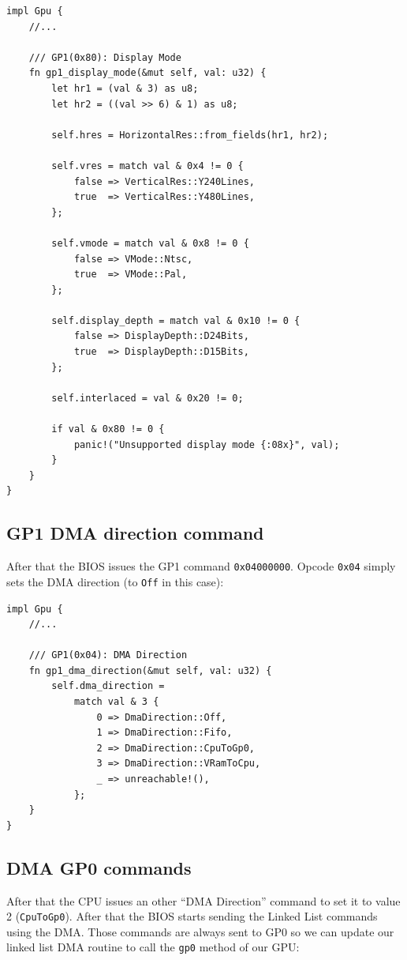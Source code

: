 \documentclass[a4paper]{article}
\newcommand{\code}[1] {\texttt{#1}}
\begin{document}
\begin{lstlisting}
impl Gpu {
    //...

    /// GP1(0x80): Display Mode
    fn gp1_display_mode(&mut self, val: u32) {
        let hr1 = (val & 3) as u8;
        let hr2 = ((val >> 6) & 1) as u8;

        self.hres = HorizontalRes::from_fields(hr1, hr2);

        self.vres = match val & 0x4 != 0 {
            false => VerticalRes::Y240Lines,
            true  => VerticalRes::Y480Lines,
        };

        self.vmode = match val & 0x8 != 0 {
            false => VMode::Ntsc,
            true  => VMode::Pal,
        };

        self.display_depth = match val & 0x10 != 0 {
            false => DisplayDepth::D24Bits,
            true  => DisplayDepth::D15Bits,
        };

        self.interlaced = val & 0x20 != 0;

        if val & 0x80 != 0 {
            panic!("Unsupported display mode {:08x}", val);
        }
    }
}
\end{lstlisting}

\subsection{GP1 DMA direction command}

After that the BIOS issues the GP1 command \code{0x04000000}. Opcode
\code{0x04} simply sets the DMA direction (to \code{Off} in this
case):

\begin{lstlisting}
impl Gpu {
    //...

    /// GP1(0x04): DMA Direction
    fn gp1_dma_direction(&mut self, val: u32) {
        self.dma_direction =
            match val & 3 {
                0 => DmaDirection::Off,
                1 => DmaDirection::Fifo,
                2 => DmaDirection::CpuToGp0,
                3 => DmaDirection::VRamToCpu,
                _ => unreachable!(),
            };
    }
}
\end{lstlisting}

\subsection{DMA GP0 commands}

After that the CPU issues an other ``DMA Direction'' command to set it
to value 2 (\code{CpuToGp0}). After that the BIOS starts sending the
Linked List commands using the DMA. Those commands are always sent to
GP0 so we can update our linked list DMA routine to call the
\code{gp0} method of our GPU:
\end{document}
